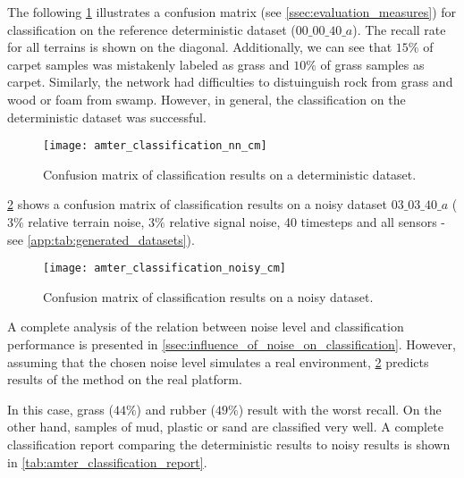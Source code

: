 The following \cref{fig:amter_cm_nn} illustrates a confusion matrix (see \cref{ssec:evaluation_measures}) for classification on the reference deterministic dataset ($ 00\_00\_40\_a $). The recall rate for all terrains is shown on the diagonal. Additionally, we can see that $ 15\% $ of carpet samples was mistakenly labeled as grass and $ 10\% $ of grass samples as carpet. Similarly, the network had difficulties to distuinguish rock from grass and wood or foam from swamp. However, in general, the classification on the deterministic dataset was successful.

\begin{figure}[H]
  \centering
  \texttt{[image: amter\_classification\_nn\_cm]}
  \caption{Confusion matrix of classification results on a deterministic dataset.}
  \label{fig:amter_cm_nn}
\end{figure}

\cref{fig:amter_cm_noisy} shows a confusion matrix of classification results on a noisy dataset $ 03\_03\_40\_a $ ($ 3\% $ relative terrain noise, $ 3\% $ relative signal noise, 40 timesteps and all sensors - see \cref{app:tab:generated_datasets}).

\begin{figure}[H]
  \centering
  \texttt{[image: amter\_classification\_noisy\_cm]}
  \caption{Confusion matrix of classification results on a noisy dataset.}
  \label{fig:amter_cm_noisy}
\end{figure}

A complete analysis of the relation between noise level and classification performance is presented in \cref{ssec:influence_of_noise_on_classification}. However, assuming that the chosen noise level simulates a real environment, \cref{fig:amter_cm_noisy} predicts results of the method on the real platform.

In this case, grass ($ 44\% $) and rubber ($ 49\% $) result with the worst recall. On the other hand, samples of mud, plastic or sand are classified very well. A complete classification report comparing the deterministic results to noisy results is shown in \cref{tab:amter_classification_report}.

